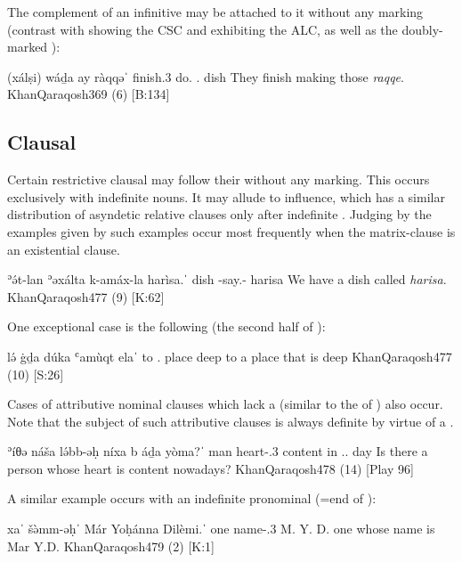 The complement of an infinitive may be attached to it without any marking (contrast with  showing the CSC and  exhibiting the ALC, as well as the doubly-marked ):

{(xálṣi) wáḏa ay\cb{}  ràqqəˈ}
{finish.3\pl{} do.\inf{} \dem.\near\cb{}  dish}
{They finish making those \textit{raqqe}.}
{KhanQaraqosh}{369 (6) {[B:134]}}\antipar

\subsection{Clausal \secns}
\label{ss:Qar_Asyndetic_Relative_Clause}

Certain restrictive clausal \secns may follow their \prim without any marking. This occurs exclusively with indefinite \prim nouns. It may allude to  influence, which has a similar distribution of asyndetic relative clauses only after indefinite \prims.  Judging by the examples given by \citet[477]{KhanQaraqosh} such examples occur most frequently when the matrix-clause is an existential clause.

 
{ʾə́t-lan ʾəxálta k-amáx-la harìsa.ˈ}
{\pl{} dish \ind-say.\pl-\fem{} harisa}
{We have a dish called \textit{harisa}.}
{KhanQaraqosh}{477 (9) {[K:62]}}\antipar

\newpage 

One exceptional case is the following (the second half of ):

{lə́\cb{} ġḏa dúka ʿamùqt\cb{} elaˈ}
{to\cb{} \indef.\fem{} place deep\cb{} \cop}
{to a place that is deep}
{KhanQaraqosh}{477 (10) {[S:26]}}

Cases of attributive nominal clauses which lack a  (similar to the  of \JZax {}) also occur. Note that the subject of such attributive clauses is always definite by virtue of a .

{ʾíθə náša lə́bb-əḥ níxa b\cb{} áḏa yòma?ˈ}
{\exist{} man heart-\poss.3\masc{} content in\cb{} \dem.\near.\masc{} day}
{Is there a person whose heart is content nowadays?}
{KhanQaraqosh}{478 (14) {[Play 96]}}

  
A similar example occurs with an indefinite pronominal \prim {}  (=end of ):

{xaˈ šə̀mm-əḥˈ Már Yoḥánna Dilèmi.ˈ}
{one name-\poss.3\masc{} M. Y. D.}
{one whose name is Mar Y.D.}
{KhanQaraqosh}{479 (2) {[K:1]}}

